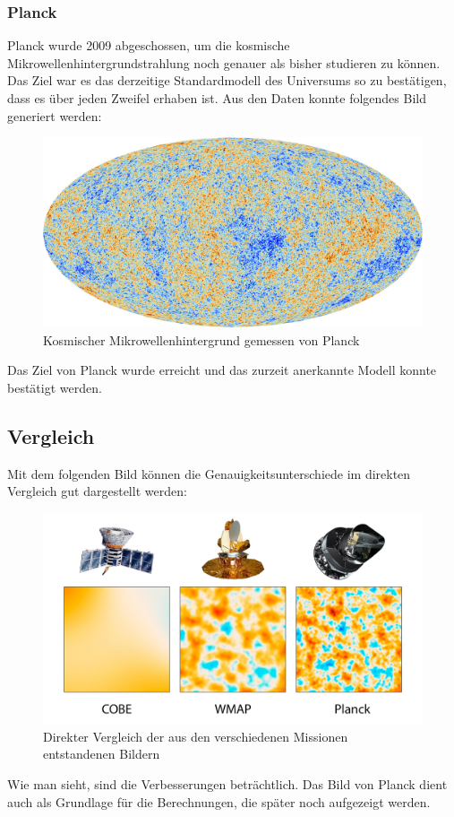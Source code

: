 \subsubsection{Planck}
Planck wurde 2009 abgeschossen, um die kosmische 
Mikrowellenhintergrundstrahlung noch genauer als bisher studieren zu können.
Das Ziel war es das derzeitige Standardmodell des Universums so zu bestätigen, 
dass es über jeden Zweifel erhaben ist.
Aus den Daten konnte folgendes Bild generiert werden:
\begin{figure}
	\includegraphics[width=\linewidth]{cmb/images/CMB_Planck.jpg}
	\caption{Kosmischer Mikrowellenhintergrund gemessen von Planck}
	\label{fig:CMB_Planck}
\end{figure}
Das Ziel von Planck wurde erreicht und das zurzeit anerkannte Modell konnte 
bestätigt werden.

\subsection{Vergleich}
Mit dem folgenden Bild können die Genauigkeitsunterschiede im direkten 
Vergleich gut dargestellt werden:
\begin{figure}
	\includegraphics[width=\linewidth]{cmb/images/COBE_WMAP_Planck.jpg}
	\caption{Direkter Vergleich der aus den verschiedenen Missionen 
	entstandenen Bildern}
	\label{fig:COBE_WMAP_PLANCK}
\end{figure}
Wie man sieht, sind die Verbesserungen beträchtlich.
Das Bild von Planck dient auch als Grundlage für die Berechnungen, die später 
noch aufgezeigt werden.